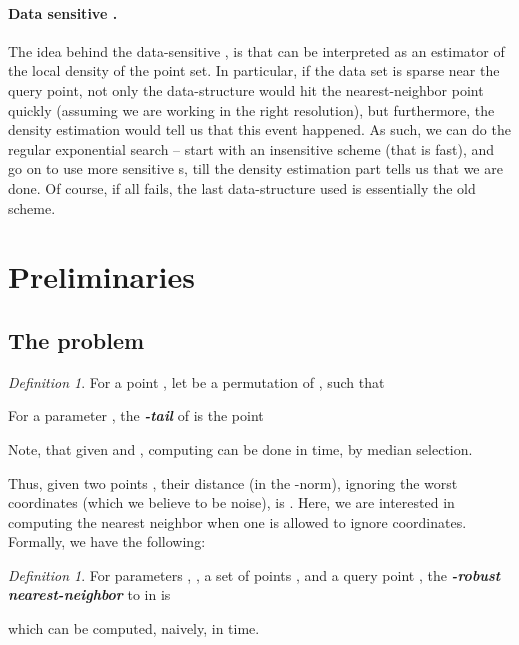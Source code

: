 \documentclass[12pt]{article}\usepackage[cm]{fullpage}
\newcommand{\emphic}[2]{\textcolor{blue25}{\textbf{\emph{#1}}}\index{#2}}
\renewcommand{\emphic}[2]{\textbf{\emph{#1}}}
\newcommand{\emphi}[1]{\emphic{#1}{#1}}
\theoremstyle{remark}\theoremheaderfont{\sf}\theorembodyfont{\upshape}\newtheorem{defn}[theorem]{Definition}
\numberwithin{figure}{section}\numberwithin{table}{section}\numberwithin{equation}{section}
\providecommand{\deflab}[1]{\label{def:#1}}
\begin{document}
\paragraph{Data sensitive \LSH.}

The idea behind the data-sensitive \LSH, is that \LSH can be
interpreted as an estimator of the local density of the point set. In
particular, if the data set is sparse near the query point, not only
the \LSH data-structure would hit the nearest-neighbor point quickly
(assuming we are working in the right resolution), but furthermore,
the density estimation would tell us that this event happened. As
such, we can do the regular exponential search -- start with an
insensitive \LSH scheme (that is fast), and go on to use more
sensitive \LSH{}s, till the density estimation part tells us that we
are done. Of course, if all fails, the last \LSH data-structure used
is essentially the old \LSH scheme.



\section{Preliminaries}

\subsection{The problem}

\begin{defn}
    \deflab{tail}For a point , let  be a
    permutation of , such that
    
    For a parameter , the \emphi{-tail} of 
    is the point
    
    Note, that given  and , computing
     can be done in  time, by median selection.
\end{defn}

Thus, given two points , their distance (in the
-norm), ignoring the  worst coordinates (which we believe to
be noise), is .  Here, we are
interested in computing the nearest neighbor when one is allowed to
ignore  coordinates. Formally, we have the following:


\begin{defn}
    \deflab{k:fold:n:n}For parameters , , a set of points
    , and a query point ,
    the \emphi{-robust nearest-neighbor} to  in 
    is
    
    which can be computed, naively, in  time.
\end{defn}
\end{document}
